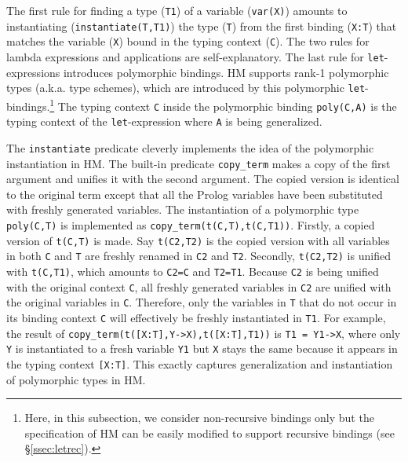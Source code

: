 \documentclass[runningheads,a4paper]{llncs}
\begin{document}
The first rule for finding a type ({\small\verb|T1|}) of a variable
({\small\verb|var(X)|}) amounts to instantiating
({\small\verb|instantiate(T,T1)|}) the type ({\small\verb|T|}) from
the first binding ({\small\verb|X:T|}) that matches the variable
({\small\verb|X|}) bound in the typing context ({\small\verb|C|}).
The two rules for lambda expressions and applications are self-explanatory.
The last rule for \texttt{let}-expressions introduces polymorphic bindings.
HM supports rank-1 polymorphic types (a.k.a. type schemes), which are
introduced by this polymorphic \texttt{let}-bindings.\footnote{ Here,
	in this subsection, we consider non-recursive bindings only 
	but the specification of HM can be easily modified to support
	recursive bindings (see \S\ref{ssec:letrec}).}
The typing context {\small\texttt{C}} inside the polymorphic binding
{\small\verb|poly(C,A)|} is the typing context of the \texttt{let}-expression
where \texttt{A} is being generalized.




The {\small\verb|instantiate|} predicate
cleverly implements the idea of the polymorphic instantiation in HM.
The built-in predicate {\small\verb|copy_term|} makes a copy of
the first argument and unifies it with the second argument. The copied version
is identical to the original term except that all the Prolog variables have been
substituted with freshly generated variables. The instantiation of a polymorphic
type {\small\verb|poly(C,T)|} is implemented as
{\small\verb|copy_term(t(C,T),t(C,T1))|}.
Firstly, a copied version of {\small\verb|t(C,T)|} is made.
Say {\small\verb|t(C2,T2)|} is the copied version with all variables
in both {\small\verb|C|} and {\small\verb|T|}
are freshly renamed in {\small\verb|C2|} and {\small\verb|T2|}.
Secondly, {\small\verb|t(C2,T2)|}
is unified with {\small\verb|t(C,T1)|}, which amounts to {\small\verb|C2=C|}
and {\small\verb|T2=T1|}. Because {\small\verb|C2|} is being unified with
the original context {\small\verb|C|}, all freshly generated variables in
{\small\verb|C2|} are unified with the original variables in \verb|C|.
Therefore, only the variables in {\small\verb|T|} that do not occur in its
binding context {\small\verb|C|} will effectively be freshly instantiated in 
{\small\verb|T1|}. For example, the result of 
{\small\verb|copy_term(t([X:T],Y->X),t([X:T],T1))|} is
{\small\verb|T1 = Y1->X|}, where only {\small\verb|Y|} is instantiated to
a fresh variable {\small\verb|Y1|} but {\small\verb|X|} stays the same
because it appears in the typing context {\small\verb|[X:T]|}. This exactly
captures generalization and instantiation of polymorphic types in HM.
\end{document}
